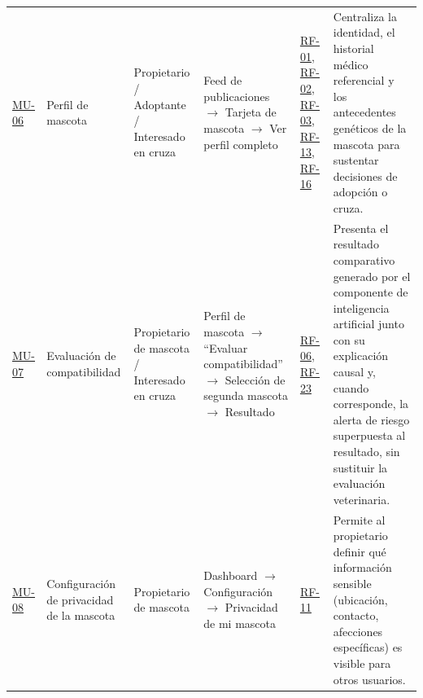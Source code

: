 \documentclass[journal,onecolumn]{IEEEtran}
\begin{document}
{\begin{longtable}{@{}L{1.5cm} L{2.0cm} L{2.3cm} L{3.2cm} L{2.0cm} L{2.9cm}@{}}
			\addlinespace
			\hyperref[fig:mu06]{MU-06} & Perfil de mascota & Propietario / Adoptante / Interesado en cruza & Feed de publicaciones $\rightarrow$ Tarjeta de mascota $\rightarrow$ Ver perfil completo & \hyperref[tab:RF-01]{RF-01}, \hyperref[tab:RF-02]{RF-02}, \hyperref[tab:RF-03]{RF-03}, \hyperref[tab:RF-13]{RF-13}, \hyperref[tab:RF-16]{RF-16} & Centraliza la identidad, el historial médico referencial y los antecedentes genéticos de la mascota para sustentar decisiones de adopción o cruza. \\
			\addlinespace
			\hyperref[fig:mu07]{MU-07} & Evaluación de compatibilidad & Propietario de mascota / Interesado en cruza & Perfil de mascota $\rightarrow$ \enquote{Evaluar compatibilidad} $\rightarrow$ Selección de segunda mascota $\rightarrow$ Resultado & \hyperref[tab:RF-06]{RF-06}, \hyperref[tab:RF-23]{RF-23} & Presenta el resultado comparativo generado por el componente de inteligencia artificial junto con su explicación causal y, cuando corresponde, la alerta de riesgo superpuesta al resultado, sin sustituir la evaluación veterinaria. \\
			\addlinespace
			\hyperref[fig:mu08]{MU-08} & Configuración de privacidad de la mascota & Propietario de mascota & Dashboard $\rightarrow$ Configuración $\rightarrow$ Privacidad de mi mascota & \hyperref[tab:RF-11]{RF-11} & Permite al propietario definir qué información sensible (ubicación, contacto, afecciones específicas) es visible para otros usuarios. \\
		\end{longtable}
	}
	
\end{document}
